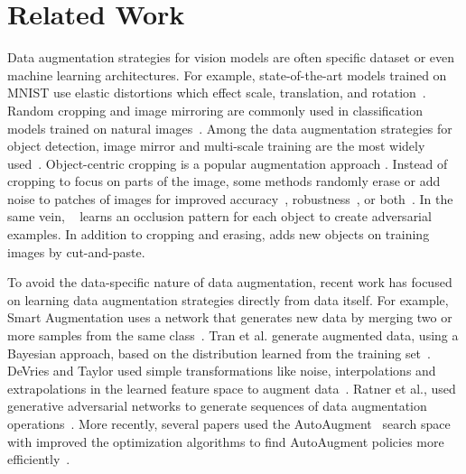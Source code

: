 \documentclass[10pt,twocolumn,letterpaper]{article}
\begin{document}
 \section{Related Work}
Data augmentation strategies for vision models are often specific dataset or even machine learning architectures. For example, state-of-the-art models trained on MNIST use elastic distortions which effect scale, translation, and rotation~\cite{simard2003best,ciregan2012multi,wan2013regularization,sato2015apac}. Random cropping and image mirroring are commonly used in classification models trained on natural images~\cite{WRN2016,krizhevsky2012imagenet}. 
Among the data augmentation strategies for object detection, image mirror and multi-scale training are the most widely used~\cite{girshick2018detectron}. Object-centric cropping is a popular augmentation approach \cite{liu2016ssd}. Instead of cropping to focus on parts of the image, some methods randomly erase or add noise to patches of images for improved accuracy~\cite{cutout2017,zhong2017random,ghiasi2018dropblock}, robustness~\cite{yin2019afourier,ford2019adversarial}, or both~\cite{lopes2019improving}. In the same vein, ~\cite{wang2017fast} learns an occlusion pattern for each object to create adversarial examples. In addition to cropping and erasing, \cite{dwibedi2017cut} adds new objects on training images by cut-and-paste.


To avoid the data-specific nature of data augmentation, recent work has focused on learning data augmentation strategies directly from data itself. For example, Smart Augmentation uses a network that generates new data by merging two or more samples from the same class~\cite{lemley2017smart}. Tran et al. generate augmented data, using a Bayesian approach, based on the distribution learned from the training set~\cite{tran2017bayesian}. DeVries and Taylor used simple transformations like noise, interpolations and extrapolations in the learned feature space to augment data~\cite{devries2017dataset}. Ratner et al., used generative adversarial networks to generate sequences of data augmentation operations~\cite{ratner2017learning}. More recently, several papers used the AutoAugment~\cite{cubuk2018autoaugment} search space with improved the optimization algorithms to find AutoAugment policies more efficiently~\cite{ho2019population, lim2019fast}.  
\end{document}
